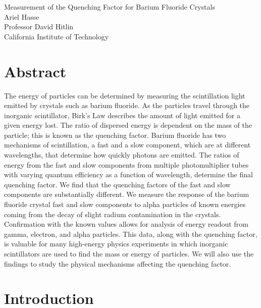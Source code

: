 \documentclass{article}
\begin{document}
\noindent 
Measurement of the Quenching Factor for Barium Fluoride Crystals\\
Ariel Hasse\\
Professor David Hitlin\\
California Institute of Technology\\


\section{Abstract}
The energy of particles can be determined by measuring the scintillation light emitted by crystals such as barium fluoride. As the particles travel through the inorganic scintillator, Birk’s Law describes the amount of light emitted for a given energy lost. The ratio of dispersed energy is dependent on the mass of the particle; this is known as the quenching factor. Barium fluoride has two mechanisms of scintillation, a fast and a slow component, which are at different wavelengths, that determine how quickly photons are emitted. The ratios of energy from the fast and slow components from multiple photomultiplier tubes with varying quantum efficiency as a function of wavelength, determine the final quenching factor. We find that the quenching factors of the fast and slow components are substantially different.
We measure the response of the barium fluoride crystal fast and slow components to alpha particles of known energies coming from the decay of slight radium contamination in the crystals. Confirmation with the known values allows for analysis of energy readout from gamma, electron, and alpha particles. This data, along with the quenching factor, is valuable for many high-energy physics experiments in which inorganic scintillators are used to find the mass or energy of particles. We will also use the findings to study the physical mechanisms affecting the quenching factor.


\section{Introduction}
\end{document}
